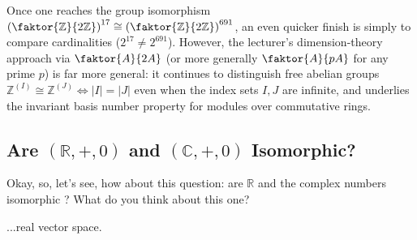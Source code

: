 \begin{aiNote}
Once one reaches the group isomorphism $\left(\faktor{\mathbb{Z}}{2\mathbb{Z}}\right)^{17} \cong \left(\faktor{\mathbb{Z}}{2\mathbb{Z}}\right)^{691}$, an even quicker finish is simply to compare cardinalities ($2^{17} \neq 2^{691}$). However, the lecturer's dimension-theory approach via $\faktor{A}{2A}$ (or more generally $\faktor{A}{pA}$ for any prime $p$) is far more general: it continues to distinguish free abelian groups $\mathbb{Z}^{(I)} \cong \mathbb{Z}^{(J)} \iff |I| = |J|$ even when the index sets $I, J$ are infinite, and underlies the invariant basis number property for modules over commutative rings.
\end{aiNote}

\subsection{Are \texorpdfstring{$(\mathbb{R}, +, 0)$}{(R, +, 0)} and \texorpdfstring{$(\mathbb{C}, +, 0)$}{(C, +, 0)} Isomorphic?}

\begin{speech}[00:39:55 - 00:40:13]
Okay, so, let's see, how about this question: are $\mathbb{R}$ and the complex numbers isomorphic ? What do you think about this one?
\end{speech}

\begin{student}
 ...real vector space.
\end{student}

